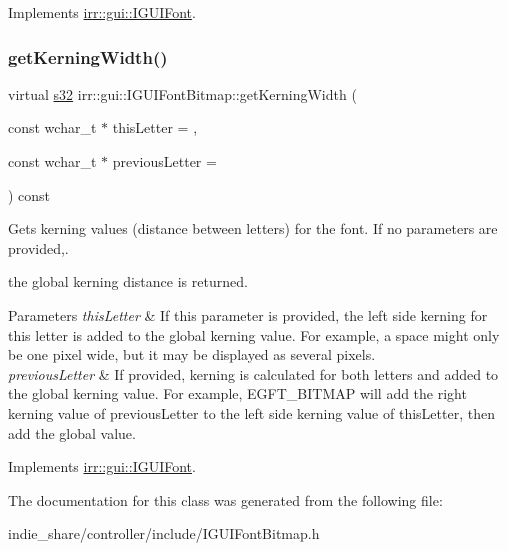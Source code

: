 Implements \hyperlink{classirr_1_1gui_1_1IGUIFont_a7de0b25d3d1dbdcc9036e5d788e2d9ab}{irr\+::gui\+::\+I\+G\+U\+I\+Font}.

\mbox{\label{classirr_1_1gui_1_1IGUIFontBitmap_a7bdeaea45745a10e09f7769ec3b95a12}} 
\subsubsection{\texorpdfstring{get\+Kerning\+Width()}{getKerningWidth()}\hspace{0.1cm}{\footnotesize\ttfamily [2/2]}}
{\footnotesize\ttfamily virtual \hyperlink{namespaceirr_ac66849b7a6ed16e30ebede579f9b47c6}{s32} irr\+::gui\+::\+I\+G\+U\+I\+Font\+Bitmap\+::get\+Kerning\+Width (\begin{DoxyParamCaption}\item[{const wchar\+\_\+t $\ast$}]{this\+Letter = {},  }\item[{const wchar\+\_\+t $\ast$}]{previous\+Letter = {} }\end{DoxyParamCaption}) const\hspace{0.3cm}{\ttfamily [pure virtual]}}



Gets kerning values (distance between letters) for the font. If no parameters are provided,. 

the global kerning distance is returned. 
\begin{DoxyParams}{Parameters}
{\em this\+Letter} & If this parameter is provided, the left side kerning for this letter is added to the global kerning value. For example, a space might only be one pixel wide, but it may be displayed as several pixels. \\
\hline
{\em previous\+Letter} & If provided, kerning is calculated for both letters and added to the global kerning value. For example, E\+G\+F\+T\+\_\+\+B\+I\+T\+M\+AP will add the right kerning value of previous\+Letter to the left side kerning value of this\+Letter, then add the global value. \\
\hline
\end{DoxyParams}


Implements \hyperlink{classirr_1_1gui_1_1IGUIFont_a7de0b25d3d1dbdcc9036e5d788e2d9ab}{irr\+::gui\+::\+I\+G\+U\+I\+Font}.



The documentation for this class was generated from the following file\+:\begin{DoxyCompactItemize}
\item 
indie\+\_\+share/controller/include/I\+G\+U\+I\+Font\+Bitmap.\+h\end{DoxyCompactItemize}
